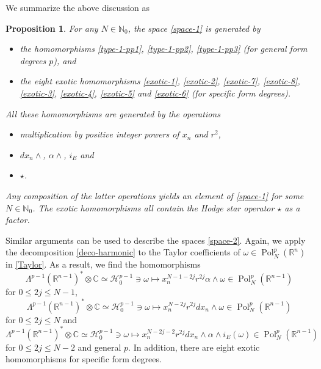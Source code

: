 \documentclass[a4paper,12pt,reqno]{amsart}
\newtheorem{prop}[theorem]{Proposition}
\numberwithin{theorem}{subsection}
\numberwithin{equation}{section}
\begin{document}
We summarize the above discussion as

\begin{prop}\label{structure-type-1} For any $N \in {\mathbb{N}}_0$, the space
\eqref{space-1} is generated by
\begin{itemize}
\item the homomorphisms \eqref{type-1-pp1}, \eqref{type-1-pp2}, \eqref{type-1-pp3}
(for general form degrees $p$), and
\item the eight exotic homomorphisms \eqref{exotic-1},
\eqref{exotic-2}, \eqref{exotic-7}, \eqref{exotic-8}, \eqref{exotic-3},
\eqref{exotic-4}, \eqref{exotic-5} and \eqref{exotic-6} (for specific form
degrees).
\end{itemize}
All these homomorphisms are generated by the operations
\begin{itemize}
\item multiplication by positive integer powers of $x_n$ and $r^2$,
\item $dx_n \wedge$, $\alpha \wedge$, $i_E$ and
\item $\star$.
\end{itemize}
Any composition of the latter operations yields an element of \eqref{space-1}
for some $N \in {\mathbb{N}}_0$. The exotic homomorphisms all contain the Hodge star
operator $\star$ as a factor.
\end{prop}

Similar arguments can be used to describe the spaces \eqref{space-2}. Again, we
apply the decomposition \eqref{deco-harmonic} to the Taylor coefficients of
$\omega \in {\operatorname{Pol}}_N^p({\mathbb{R}}^n)$ in \eqref{Taylor}. As a result, we find the
homomorphisms
\begin{equation}\label{type-2-pp-1}
    \Lambda^{p-1}({\mathbb{R}}^{n-1})^* \otimes {\mathbb{C}} \simeq {\mathcal H}_0^{p-1} \ni \omega
    \mapsto x_n^{N-1-2j} r^{2j} \alpha \wedge \omega \in {\operatorname{Pol}}^p_N({\mathbb{R}}^{n-1})
\end{equation}
for $0 \le 2j \le N\!-\!1$,
\begin{equation}\label{type-2-pp-2}
   \Lambda^{p-1}({\mathbb{R}}^{n-1})^* \otimes {\mathbb{C}} \simeq {\mathcal H}_0^{p-1} \ni \omega \mapsto x_n^{N-2j}
   r^{2j} dx_n \wedge \omega \in {\operatorname{Pol}}^p_N({\mathbb{R}}^{n-1})
\end{equation}
for $0 \le 2j \le N$ and
\begin{equation}\label{type-2-pp-3}
   \Lambda^{p-1}({\mathbb{R}}^{n-1})^* \otimes {\mathbb{C}} \simeq {\mathcal H}_0^{p-1} \ni \omega
   \mapsto x_n^{N-2j-2} r^{2j} dx_n \wedge \alpha \wedge i_E(\omega) \in {\operatorname{Pol}}^p_N({\mathbb{R}}^{n-1})
\end{equation}
for $0 \le 2j \le N\!-\!2$ and general $p$. In addition, there are eight exotic
homomorphisms for specific form degrees.
\end{document}
